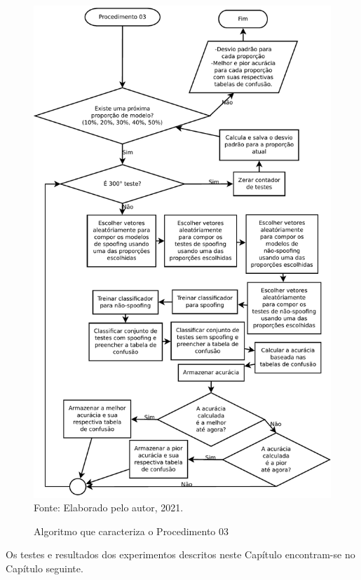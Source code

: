		
		
		\begin{figure}[h]
			\centering
			\caption{Algoritmo que caracteriza o Procedimento 03}
			\includegraphics[width=0.9\linewidth]{images/AlgoProcedure03}
			\label{fig:experiment03Algo}
			\\Fonte: Elaborado pelo autor, 2021.
		\end{figure}

        \par Os testes e resultados dos experimentos descritos neste Capítulo encontram-se no Capítulo seguinte.
